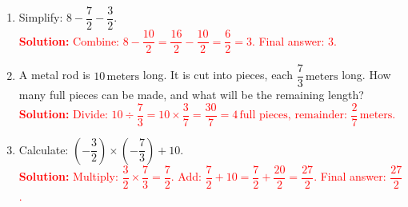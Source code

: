 \documentclass[11pt]{article}
\begin{document}
\begin{tcolorbox}[colframe=black!60, colback=white, 
coltitle=black, colbacktitle=black!15, fonttitle=\bfseries\Large, 
title=Exercises, halign title=center, left=10pt, right=10pt, top=10pt, bottom=70pt]
\begin{enumerate}[itemsep=1em]
    \item Simplify: \( 8 - \dfrac{7}{2} - \dfrac{3}{2} \).\\
    \textcolor{red}{\textbf{Solution:} Combine: \( 8 - \dfrac{10}{2} = \dfrac{16}{2} - \dfrac{10}{2} = \dfrac{6}{2} = 3 \). Final answer: \( 3 \).}

    \item A metal rod is \( 10 \, \text{meters} \) long. It is cut into pieces, each \( \dfrac{7}{3} \, \text{meters} \) long. How many full pieces can be made, and what will be the remaining length?\\
    \textcolor{red}{\textbf{Solution:} Divide: \( 10 \div \dfrac{7}{3} = 10 \times \dfrac{3}{7} = \dfrac{30}{7} = 4 \, \text{full pieces}, \, \text{remainder: } \dfrac{2}{7} \, \text{meters.} \)}

    \item Calculate: \( (-\dfrac{3}{2}) \times (-\dfrac{7}{3}) + 10 \).\\
    \textcolor{red}{\textbf{Solution:} Multiply: \( \dfrac{3}{2} \times \dfrac{7}{3} = \dfrac{7}{2} \). Add: \( \dfrac{7}{2} + 10 = \dfrac{7}{2} + \dfrac{20}{2} = \dfrac{27}{2} \). Final answer: \( \dfrac{27}{2} \).}
\end{enumerate}
\end{tcolorbox}

\vspace{1em}
\end{document}
